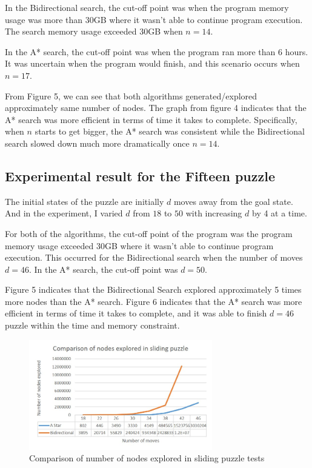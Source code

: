 \documentclass[conference]{IEEEtran}
\begin{document}
In the Bidirectional search, the cut-off point was when the program memory usage was more than 30GB where it wasn't able to continue program execution. The search memory usage exceeded 30GB when $n = 14$.

In the A* search, the cut-off point was when the program ran more than 6 hours. It was uncertain when the program would finish, and this scenario occurs when $n = 17$. 

From Figure 5, we can see that both algorithms generated/explored approximately same number of nodes. 
The graph from figure 4 indicates that the A* search was more efficient in terms of time it takes to complete. Specifically, when $n$ starts to get bigger, the A* search was consistent while the Bidirectional search slowed down much more dramatically once $n = 14$. 

\subsection{Experimental result for the Fifteen puzzle}

The initial states of the puzzle are initially $d$ moves away from the goal state. And in the experiment, I varied $d$ from $18$ to $50$ with increasing $d$ by 4 at a time.

For both of the algorithms, the cut-off point of the program was the program memory usage exceeded 30GB where it wasn't able to continue program execution. This occurred for the Bidirectional search when the number of moves $d = 46$. In the A* search, the cut-off point was $d = 50$. 

Figure 5 indicates that the Bidirectional Search explored approximately 5 times more nodes than the A* search. Figure 6 indicates that the A* search was more efficient in terms of time it takes to complete, and it was able to finish $d = 46$ puzzle within the time and memory constraint.

\begin{figure}[!t]
\includegraphics[width=8cm]{slidingNodes}
\centering
\caption{Comparison of number of nodes explored in sliding puzzle tests}
\label{fig_sim}
\end{figure}
\end{document}
